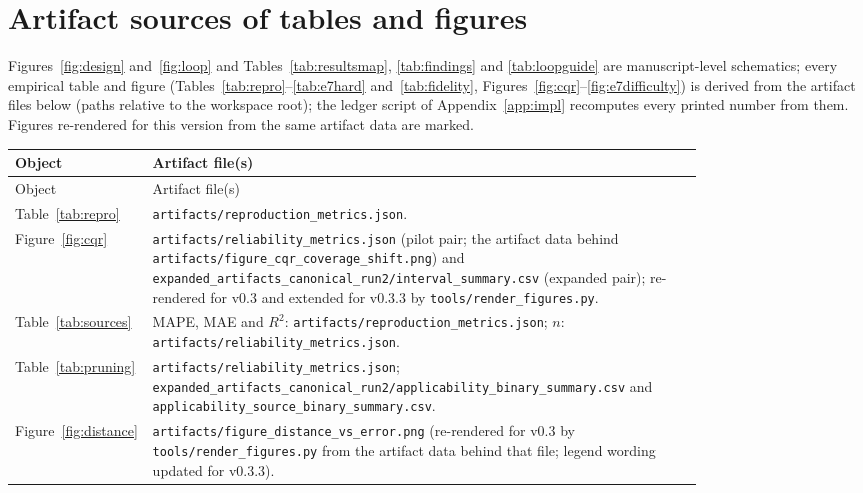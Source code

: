 \documentclass[11pt,a4paper]{article}
\begin{document}
\section{Artifact sources of tables and figures}
\label{app:sources}
Figures~\ref{fig:design} and~\ref{fig:loop} and Tables~\ref{tab:resultsmap}, \ref{tab:findings} and \ref{tab:loopguide} are manuscript-level
schematics; every empirical table and figure
(Tables~\ref{tab:repro}--\ref{tab:e7hard} and~\ref{tab:fidelity},
Figures~\ref{fig:cqr}--\ref{fig:e7difficulty}) is derived from the artifact
files below (paths relative to the workspace root); the ledger script of
Appendix~\ref{app:impl} recomputes every printed number from them. Figures
re-rendered for this version from the same artifact data are marked.
{\scriptsize
\begin{longtable}{lp{0.80\linewidth}}
\toprule
Object & Artifact file(s) \\
\midrule
\endfirsthead
\toprule
Object & Artifact file(s) \\
\midrule
\endhead
Table~\ref{tab:repro} & \texttt{artifacts/\allowbreak reproduction\_\allowbreak metrics.json}. \\
Figure~\ref{fig:cqr} & \texttt{artifacts/\allowbreak reliability\_\allowbreak metrics.json} (pilot pair; the artifact data behind \texttt{artifacts/\allowbreak figure\_\allowbreak cqr\_\allowbreak coverage\_\allowbreak shift.png}) and \texttt{expanded\_\allowbreak artifacts\_\allowbreak canonical\_\allowbreak run2/\allowbreak interval\_\allowbreak summary.csv} (expanded pair); re-rendered for v0.3 and extended for v0.3.3 by \texttt{tools/\allowbreak render\_\allowbreak figures.py}. \\
Table~\ref{tab:sources} & MAPE, MAE and $R^2$: \texttt{artifacts/\allowbreak reproduction\_\allowbreak metrics.json}; $n$: \texttt{artifacts/\allowbreak reliability\_\allowbreak metrics.json}. \\
Table~\ref{tab:pruning} & \texttt{artifacts/\allowbreak reliability\_\allowbreak metrics.json}; \texttt{expanded\_\allowbreak artifacts\_\allowbreak canonical\_\allowbreak run2/\allowbreak applicability\_\allowbreak binary\_\allowbreak summary.csv} and \texttt{applicability\_\allowbreak source\_\allowbreak binary\_\allowbreak summary.csv}. \\
Figure~\ref{fig:distance} & \texttt{artifacts/\allowbreak figure\_\allowbreak distance\_\allowbreak vs\_\allowbreak error.png} (re-rendered for v0.3 by \texttt{tools/\allowbreak render\_\allowbreak figures.py} from the artifact data behind that file; legend wording updated for v0.3.3). \\

\end{longtable}}
\end{document}
